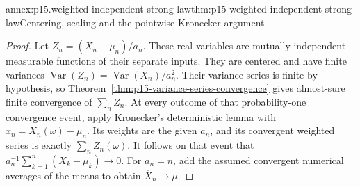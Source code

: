 \begin{annexitem}{annex:p15.weighted-independent-strong-law}{thm:p15-weighted-independent-strong-law}{Centering, scaling and the pointwise Kronecker argument}
\begin{proof}
Let \(Z_n=(X_n-\mu_n)/a_n\). These real variables are mutually
independent measurable functions of their separate inputs. They are
centered and have finite variances
\(\operatorname{Var}(Z_n)=\operatorname{Var}(X_n)/a_n^2\).
Their variance series is finite by hypothesis, so
Theorem~\ref{thm:p15-variance-series-convergence} gives almost-sure
finite convergence of \(\sum_nZ_n\).
At every outcome of that probability-one convergence event, apply
Kronecker's deterministic lemma with
\(x_n=X_n(\omega)-\mu_n\). Its weights are the given \(a_n\),
and its convergent weighted series is exactly \(\sum_nZ_n(\omega)\).
It follows on that event that
\(a_n^{-1}\sum_{k=1}^n(X_k-\mu_k)\to0\).
For \(a_n=n\), add the assumed convergent numerical averages of
the means to obtain \(\overline X_n\to\mu\).
\end{proof}
\end{annexitem}

